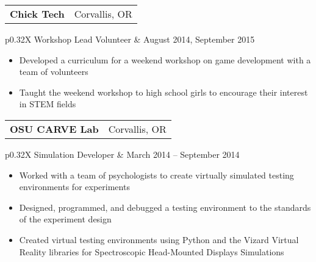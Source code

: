 \documentclass[letterpaper,10pt,titlepage]{article}
\newcommand{\leftW}{0.32\textwidth}
\begin{document}
\begin{tabularx}{\linewidth}{Xr}
	\textbf{Chick Tech} & Corvallis, OR\\
\end{tabularx}
\begin{tabularx}{\linewidth}{p{\leftW}X}
Workshop Lead Volunteer          &  August 2014, September 2015\\
\end{tabularx}
\begin{itemize} \itemsep1pt \parskip0pt 
\item Developed a curriculum for a weekend workshop on game development with a team of volunteers
\item Taught the weekend workshop to high school girls to encourage their interest in STEM fields
\end{itemize}

\begin{tabularx}{\linewidth}{Xr}
	\textbf{OSU CARVE Lab} & Corvallis, OR\\
\end{tabularx}
\begin{tabularx}{\linewidth}{p{\leftW}X}
	Simulation Developer   & March 2014 -- September 2014\\
\end{tabularx}
\begin{itemize} \itemsep1pt \parskip0pt 
\item Worked with a team of psychologists to create virtually simulated testing environments for experiments
\item Designed, programmed, and debugged a testing environment to the standards of the experiment design
\item Created virtual testing environments using Python and the Vizard Virtual Reality libraries for Spectroscopic Head-Mounted Displays Simulations
\end{itemize}

\begin{comment} %
\begin{tabularx}{\linewidth}{Xr}
\textbf{\textit{Crossroads Carnegie Art Center}} & \textbf{Volunteer}\\
\textbf{Technical Support, Web Master}           & June 2013 -- August 2013\\
Baker City, Oregon & \\
\end{tabularx}

\begin{itemize} \itemsep1pt \parskip0pt \parsep0pt
\item Created digital backups of previous years tax information
\item Transferred customer data to a new cloud database for the Center
\item Maintained custom PHP/XHTML website to specifications
\item Provided consultation on creation of requirements for a new website
\end{itemize}
\end{comment}
\end{document}
